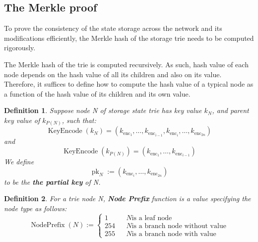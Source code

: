 \documentclass{article}
\newcommand{\assign}{:=}
\newcommand{\tmop}[1]{\ensuremath{\operatorname{#1}}}
\newcommand{\tmstrong}[1]{\textbf{#1}}
\newcommand{\tmtextbf}[1]{{\bfseries{#1}}}
\newtheorem{definition}{Definition}
\providecommand{\tmop}[1]{\ensuremath{\mathrm{#1}}}
\providecommand{\tmstrong}[1]{\tmtextbf{#1}}
\providecommand{\tmtextbf}[1]{\tmtextbf{#1}}
\newtheorem{definition}{Definition}
\begin{document}
\subsection{The Merkle proof}\label{sect-merkl-proof}

To prove the consistency of the state storage across the network and its
modifications efficiently, the Merkle hash of the storage trie needs to be
computed rigorously.

The Merkle hash of the trie is computed recursively. As such, hash value of
each node depends on the hash value of all its children and also on its value.
Therefore, it suffices to define how to compute the hash value of a typical
node as a function of the hash value of its children and its own value.

\begin{definition}
  Suppose node N of storage state trie has key value $k_N$, and parent key
  value of $k_{P (N)}$, such that:
  \[ \tmop{KeyEncode} (k_N) = (k_{\tmop{enc}_1}, \ldots, k_{\tmop{enc}_{i -
     1}}, k_{\tmop{enc}_i}, \ldots, k_{\tmop{enc}_{2 n}}) \]
  and
  \[ \tmop{KeyEncode} (k_{P (N)}) = (k_{\tmop{enc}_1}, \ldots,
     k_{\tmop{enc}_{i - 1}}) \]
  We define
  \[ \tmop{pk}_N \assign (k_{\tmop{enc}_i}, \ldots, k_{\tmop{enc}_{2 n}}) \]
  to be the {\tmstrong{the partial key}} of N.
\end{definition}

\begin{definition}
  \label{def-node-prefix}For a trie node N, {\tmstrong{Node Prefix }}function
  is a value specifying the node type as follows:
  \[ \tmop{NodePrefix} (N) \assign \left\{ \begin{array}{lll}
       1 &  & N \text{is a leaf node}\\
       254 &  & N \text{is a branch node without value}\\
       255 &  & N \text{is a branch node with value}
     \end{array} \right. \]
\end{definition}
\end{document}

